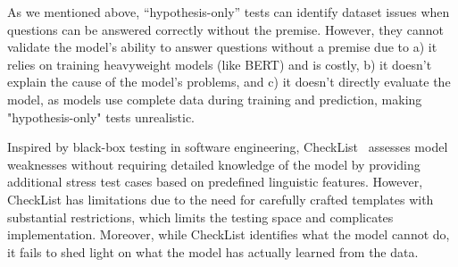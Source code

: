 
As we mentioned above, ``hypothesis-only'' tests can identify dataset issues 
when questions can be answered correctly without the premise.
However, they cannot validate the model's ability to answer questions without a 
premise due to a) it relies on training heavyweight models (like BERT) and is costly, 
b) it doesn't explain the cause of the model's problems, 
and c) it doesn't directly evaluate the model, 
as models use complete data during training and prediction, 
making "hypothesis-only" tests unrealistic.

Inspired by black-box testing in software engineering, 
CheckList~\cite{checklist2020acl} 
assesses model weaknesses without requiring detailed knowledge 
of the model by providing additional stress test cases based 
on predefined linguistic features. 
However, CheckList has limitations due to 
the need for carefully crafted templates with 
substantial restrictions, which limits the 
testing space and complicates implementation. 
Moreover, while CheckList identifies what the model cannot do, 
it fails to shed light on what the model has actually learned from the data.

